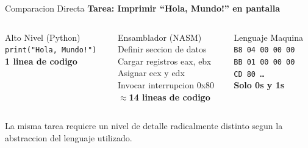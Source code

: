 \documentclass[10pt, aspectratio=169]{beamer}
\begin{document}
	\begin{frame}{Comparacion Directa}
		\centering
		\textbf{Tarea: Imprimir ``Hola, Mundo!'' en pantalla}
		\vspace{0.4cm}
		\begin{columns}
			\begin{block}{\centering Alto Nivel (Python)}
				\centering
				\vspace{0.15cm}
				\texttt{\small print("Hola, Mundo!")} \\[0.2cm]
				\textbf{1 linea de codigo}
				\vspace{0.1cm}
			\end{block}
			\begin{block}{\centering Ensamblador (NASM)}
				\centering
				\vspace{0.1cm}
				\small
				Definir seccion de datos \\
				Cargar registros eax, ebx \\
				Asignar ecx y edx \\
				Invocar interrupcion 0x80 \\[0.1cm]
				\textbf{$\approx$14 lineas de codigo}
				\vspace{0.1cm}
			\end{block}
			\begin{block}{\centering Lenguaje Maquina}
				\centering
				\vspace{0.1cm}
				\small
				\texttt{B8 04 00 00 00} \\
				\texttt{BB 01 00 00 00} \\
				\texttt{CD 80 \ldots} \\[0.1cm]
				\textbf{Solo 0s y 1s}
				\vspace{0.1cm}
			\end{block}
		\end{columns}
		\vspace{0.35cm}
		\small La misma tarea requiere un nivel de detalle radicalmente distinto
		segun la abstraccion del lenguaje utilizado.
	\end{frame}
	
\end{document}
